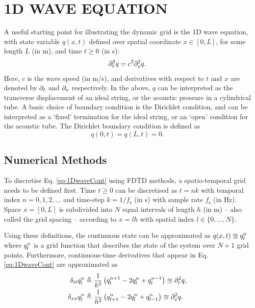 \documentclass[fleqn]{jaes}
\begin{document}
\section{1D WAVE EQUATION}\label{sec:continuous}
A useful starting point for illustrating the dynamic grid is the 1D wave equation, with state variable $q(x, t)$ defined over spatial coordinate $x \in [0, L]$, for some length $L$ (in m), and time $t \geq 0$ (in s):
\begin{equation}\label{eq:1DwaveCont}
    \ptt q = c^2 \pxx q.
\end{equation}
Here, $c$ is the wave speed (in m/s), and derivatives with respect to $t$ and $x$ are denoted by $\partial_t$ and $\partial_x$ respectively. In the above, $q$ can be interpreted as the transverse displacement of an ideal string, or the acoustic pressure in a cylindrical tube. A basic choice of boundary condition is the Dirichlet condition, and can be interpreted as a `fixed' termination for the ideal string, or an `open' condition for the acoustic tube. The Dirichlet boundary condition is defined as
\begin{equation}%
    q(0, t) = q(L, t) = 0.\label{eq:contDirichlet}
\end{equation}
\subsection{Numerical Methods}\label{sec:numericalMethods}
To discretise Eq. \eqref{eq:1DwaveCont} using FDTD methods, a spatio-temporal grid needs to be defined first. 
Time $t\geq 0$ can be discretised as $t = nk$ with temporal index $n = 0, 1, 2, \hdots$ and time-step $k = 1/f_\text{s}$ (in s) with sample rate $f_\text{s}$ (in Hz). Space $x = [0, L]$ is subdivided into $N$ equal intervals of length $h$ (in m) -- also called the grid spacing -- according to $x = lh$ with spatial index $l\in \{0, \hdots, N\}$. 

Using these definitions, the continuous state can be approximated as $q(x,t) \approxeq q_l^n$ where $q_l^n$ is a grid function that describes the state of the system over $N+1$ grid points. Furthermore, continuous-time derivatives that appear in Eq. \eqref{eq:1DwaveCont} are approximated as
\begin{subequations}{\label{eq:FDoperators}}
\begin{align}
    \dtt \qln &\triangleq \frac{1}{k^2}\left(q_l^{n+1} - 2 \qln + q_l^{n-1}\right)\approxeq\ptt q  ,\\
    \dxx \qln &\triangleq \frac{1}{h^2}\left(q_{l+1}^n - 2 \qln + q_{l-1}^n\right)\approxeq \pxx q .
\end{align}
\end{subequations}
\end{document}
